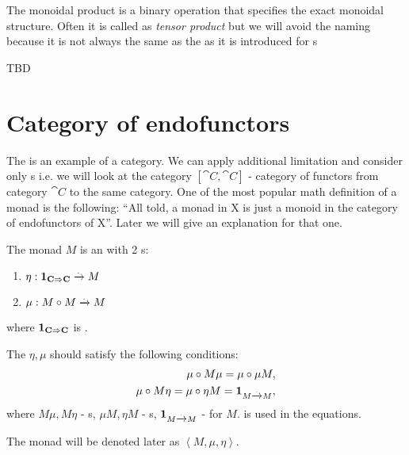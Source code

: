 \begin{remark}
\label{rem:monoidal_product}
The monoidal product is a binary operation that specifies the exact
monoidal structure. Often it is called as \textit{tensor product} but
we will avoid the naming because it is not always the same as the
 as it is introduced for
s  
\end{remark}

\begin{definition}
  \label{def:tensor_product}
  TBD
\end{definition}


\section{Category of endofunctors}

The  is an example of a category. We can
apply additional limitation and consider only
s i.e. we will look at the category
$[\cat{C}, \cat{C}]$ - category of functors from category $\cat{C}$ to
the same category. One of the most popular math definition of a monad
is the following: 
``All told, a monad in X is just a monoid in the category of
endofunctors of X''\cite{bib:maclane71}.
Later we will give an explanation for that one.

\begin{definition}[Monad]
  \label{def:monad}
  The monad $M$ is an  with 2
  s:
  \begin{enumerate}
  \item $\eta: \mathbf{1}_{ \mathbf{C} \Rightarrow \mathbf{C} } \xrightarrow{.} M$
  \item $\mu: M \circ M \xrightarrow{.} M$
  \end{enumerate}
  where $\mathbf{1}_{ \mathbf{C} \Rightarrow \mathbf{C} }$ is .

  The $\eta, \mu$ should satisfy the following conditions:
  \begin{eqnarray}
    \mu \circ M \mu = \mu \circ \mu M, 
    \nonumber \\
    \mu \circ M \eta = \mu \circ \eta M = \mathbf{1}_{ M \xrightarrow{.} M },
    \label{eq:monad}
  \end{eqnarray}
  where $M \mu, M \eta$ - s, $\mu M, \eta M$ -
  s, $\mathbf{1}_{ M \xrightarrow{.} M }$ -  for $M$.
   is used in the equations.

  The monad will be denoted later as $\left<M, \mu, \eta\right>$.
\end{definition}

